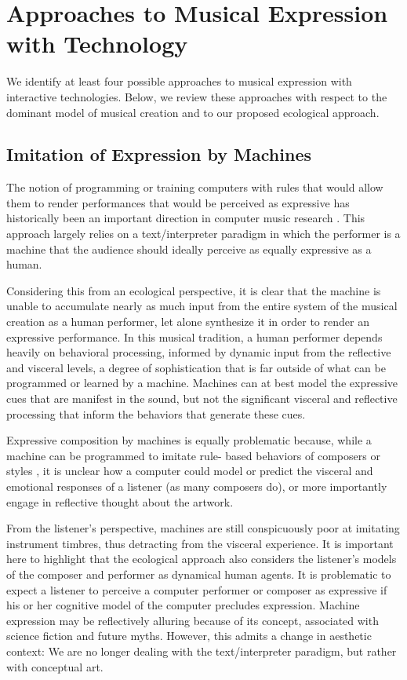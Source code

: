 \section{Approaches to Musical Expression with Technology}

We identify at least four possible approaches to musical expression with interactive technologies. Below, we review these approaches with respect to the dominant model of musical creation and to our proposed ecological approach.

\subsection{Imitation of Expression by Machines}

The notion of programming or training computers with rules that would allow them to render performances that would be perceived as expressive has historically been an important direction in computer music research \cite{Rowe:2001}. This approach largely relies on a text/interpreter paradigm in which the performer is a machine that the audience should ideally perceive as equally expressive as a human.

Considering this from an ecological perspective, it is clear that the machine is unable to accumulate nearly as much input from the entire system of the musical creation as a human performer, let alone synthesize it in order to render an expressive performance. In this musical tradition, a human performer depends heavily on behavioral processing, informed by dynamic input from the reflective and visceral levels, a degree of sophistication that is far outside of what can be programmed or learned by a machine. Machines can at best model the expressive cues that are manifest in the sound, but not the significant visceral and reflective processing that inform the behaviors that generate these cues.

Expressive composition by machines is equally problematic because, while a machine can be programmed to imitate rule- based behaviors of composers or styles \cite{Cope:1996}, it is unclear how a computer could model or predict the visceral and emotional responses of a listener (as many composers do), or more importantly engage in reflective thought about the artwork.

From the listener's perspective, machines are still conspicuously poor at imitating instrument timbres, thus detracting from the visceral experience. It is important here to highlight that the ecological approach also considers the listener's models of the composer and performer as dynamical human agents. It is problematic to expect a listener to perceive a computer performer or composer as expressive if his or her cognitive model of the computer precludes expression. Machine expression may be reflectively alluring because of its concept, associated with science fiction and future myths. However, this admits a change in aesthetic context: We are no longer dealing with the text/interpreter paradigm, but rather with conceptual art.

